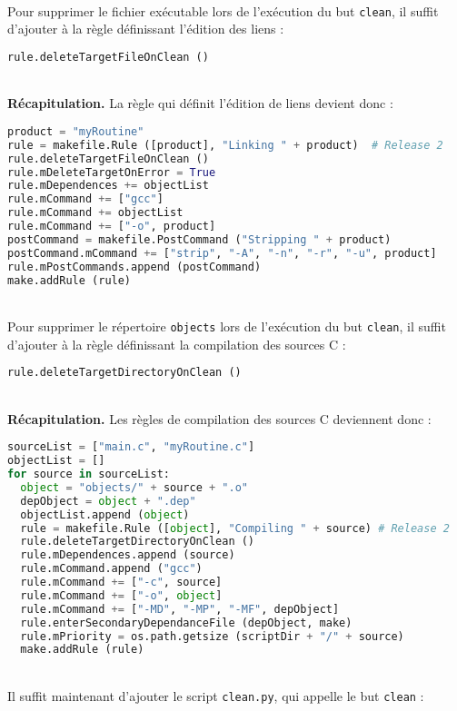 \documentclass[a4paper,11pt]{extarticle}
\begin{document}
~\\Pour supprimer le fichier exécutable lors de l'exécution du but \texttt{clean}, il suffit d'ajouter à la règle définissant l'édition des liens :

\begin{lstlisting}[language=py]
rule.deleteTargetFileOnClean ()
\end{lstlisting}


~\\{\bf Récapitulation.} La règle qui définit l'édition de liens devient donc :
\begin{lstlisting}[language=py]
product = "myRoutine"
rule = makefile.Rule ([product], "Linking " + product)  # Release 2
rule.deleteTargetFileOnClean ()
rule.mDeleteTargetOnError = True
rule.mDependences += objectList
rule.mCommand += ["gcc"]
rule.mCommand += objectList
rule.mCommand += ["-o", product]
postCommand = makefile.PostCommand ("Stripping " + product)
postCommand.mCommand += ["strip", "-A", "-n", "-r", "-u", product]
rule.mPostCommands.append (postCommand)
make.addRule (rule)
\end{lstlisting}


~\\Pour supprimer le répertoire \texttt{objects} lors de l'exécution du but \texttt{clean}, il suffit d'ajouter à la règle définissant la compilation des sources C :

\begin{lstlisting}[language=py]
  rule.deleteTargetDirectoryOnClean ()
\end{lstlisting}

~\\{\bf Récapitulation.} Les règles de compilation des sources C deviennent donc :
\begin{lstlisting}[language=py]
sourceList = ["main.c", "myRoutine.c"]
objectList = []
for source in sourceList:
  object = "objects/" + source + ".o"
  depObject = object + ".dep"
  objectList.append (object)
  rule = makefile.Rule ([object], "Compiling " + source) # Release 2
  rule.deleteTargetDirectoryOnClean ()
  rule.mDependences.append (source)
  rule.mCommand.append ("gcc")
  rule.mCommand += ["-c", source]
  rule.mCommand += ["-o", object]
  rule.mCommand += ["-MD", "-MP", "-MF", depObject]
  rule.enterSecondaryDependanceFile (depObject, make)
  rule.mPriority = os.path.getsize (scriptDir + "/" + source)
  make.addRule (rule)
\end{lstlisting}

~\\Il suffit maintenant d'ajouter le script \texttt{clean.py}, qui appelle le but \texttt{clean} :

\end{document}
